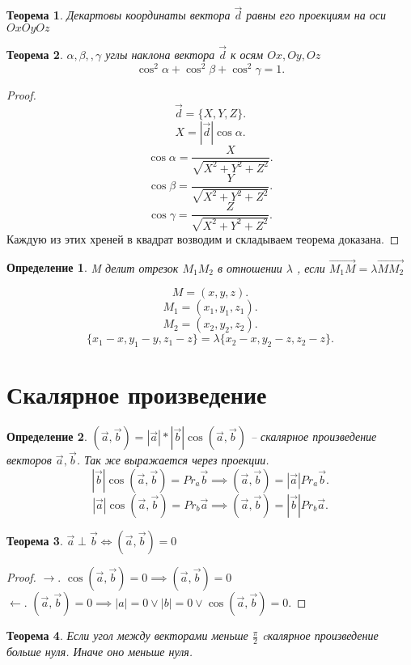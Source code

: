 \documentclass{scrartcl}
\newtheorem{theorem}{Теорема}
\newtheorem{definition}{Определение}
\begin{document}
    \begin{theorem}
        Декартовы координаты вектора $\vec{d}$ равны его проекциям на оси $Ox Oy Oz$
    \end{theorem}
    \begin{theorem}
        $\alpha,\beta,,\gamma$ углы наклона вектора  $\vec{d}$  к осям $Ox,Oy,Oz$
         \[
             \cos^2{\alpha} + \cos^2{\beta} + \cos^2{\gamma} = 1
        .\] 
    \end{theorem}
    \begin{proof}
        \[
            \vec{d} = \{X,Y,Z \}
        .\] 
        \[
            X = |\vec{d}| \cos{\alpha}
        .\] 
        \[
            \cos{\alpha} = \frac{X}{\sqrt{X^2 + Y^2 + Z^2}}
        .\] 
        \[
            \cos{\beta} = \frac{Y}{\sqrt{{X^2 + Y ^2 + Z ^2}} }
        .\] 
        \[
            \cos{\gamma} = \frac{Z}{\sqrt{X^2 + Y^2 + Z ^2} }
        .\] 
        Каждую из этих хреней в квадрат возводим и складываем теорема доказана.
    \end{proof}
    \begin{definition}
        M делит отрезок $M_1M_2$ в отношении $\lambda$ , если  $\vec{M_1M} = \lambda \vec{MM_2}$
    \end{definition}
    \[
    M = (x,y,z)
    .\] 
    \[
    M_1 = (x_1,y_1,z_1)
    .\] 
    \[
    M_2 = (x_2,y_2,z_2)
    .\] 
    \[
        \{x_1 - x, y_1 - y,z_1 - z\} = \lambda \{x_2 - x,y_2 - z,z_2 - z\}
    .\] 
    \section{Скалярное произведение}
    \begin{definition}
        $(\vec{a},\vec{b}) = |\vec{a}| * |\vec{b}|\cos{(\vec{a},\vec{b})}$ -- скалярное произведение векторов $\vec{a}, \vec{b}$. Так же выражается через проекции.
        \[
            |\vec{b}| \cos{(\vec{a},\vec{b})} = Pr_{a} \vec{b} \implies (\vec{a},\vec{b}) = |\vec{a}| Pr_{a}\vec{b}
        .\] 
        \[
            |\vec{a}| \cos{(\vec{a},\vec{b})} = Pr_{b}\vec{a} \implies (\vec{a},\vec{b}) = |\vec{b}| Pr_{b} \vec{a}
        .\] 
    \end{definition}
    \begin{theorem}
        $\vec{a} \perp \vec{b} \iff (\vec{a}, \vec{b}) = 0$
    \end{theorem}
    \begin{proof}
        $\rightarrow$.  $\cos{(\vec{a},\vec{b})} = 0 \implies (\vec{a},\vec{b}) = 0$\\
        $\leftarrow$.  $(\vec{a},\vec{b}) = 0 \implies |a| = 0 \lor |b| = 0 \lor \cos{(\vec{a},\vec{b})} = 0$.
    \end{proof}
    \begin{theorem}
        Если угол между векторами меньше $\frac{\pi}{2}$ cкалярное произведение больше нуля. Иначе оно меньше нуля.
    \end{theorem}
\end{document}
